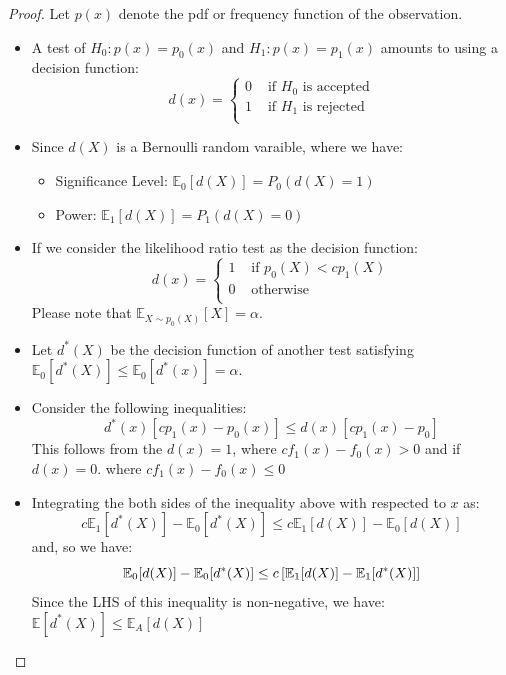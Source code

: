 \begin{proof}
    Let $p(x)$ denote the pdf or frequency function of the observation. 
    \begin{itemize}
        \item A test of $H_0 : p(x) = p_0(x)$ and $H_1 : p(x) = p_1(x)$ amounts to using a decision function:
        \begin{equation*}
            d(x) = \begin{cases}
                0 & \text{ if } H_0 \text{ is accepted} \\
                1 & \text{ if } H_1 \text{ is rejected} \\
            \end{cases}
        \end{equation*}
        \item Since $d(X)$ is a Bernoulli random varaible, where we have:
        \begin{itemize}
            \item Significance Level: $\mathbb{E}_0[d(X)] = P_0(d(X) = 1)$
            \item Power: $\mathbb{E}_1[d(X)] = P_1(d(X) = 0)$
        \end{itemize}
        \item If we consider the likelihood ratio test as the decision function:
        \begin{equation*}
            d(x) = \begin{cases}
                1 & \text{ if } p_0(X) < cp_1(X) \\
                0 & \text{ otherwise } \\
            \end{cases}
        \end{equation*}
        Please note that $\mathbb{E}_{X\sim p_0(X)}[X] = \alpha$. 
        \item Let $d^*(X)$ be the decision function of another test satisfying $\mathbb{E}_0[d^*(X)] \le \mathbb{E}_0[d^*(x)] = \alpha$. 
        \item Consider the following inequalities:
        \begin{equation*}
            d^*(x)[cp_1(x) - p_0(x)] \le d(x)[cp_1(x) - p_0]
        \end{equation*}
        This follows from the $d(x) = 1$, where $cf_1(x) - f_0(x)> 0$ and if $d(x) = 0$. where $cf_1(x) - f_0(x)\le0$
        \item Integrating the both sides of the inequality above with respected to $x$ as:
        \begin{equation*}
            c \mathbb{E}_1[d^*(X)] - \mathbb{E}_0[d^*(X)] \le c \mathbb{E}_1[d(X)] - \mathbb{E}_0[d(X)]
        \end{equation*}
        and, so we have:
        \begin{equation*}
            \mathbb{E}_0[d(X)] - \mathbb{E}_0[d^*(X)] \le c\left[ \mathbb{E}_1[d(X)] - \mathbb{E}_1[d^*(X)] \right]
        \end{equation*}
        Since the LHS of this inequality is non-negative, we have: $\mathbb{E}[d^*(X)] \le \mathbb{E}_A[d(X)]$
    \end{itemize}
\end{proof}

